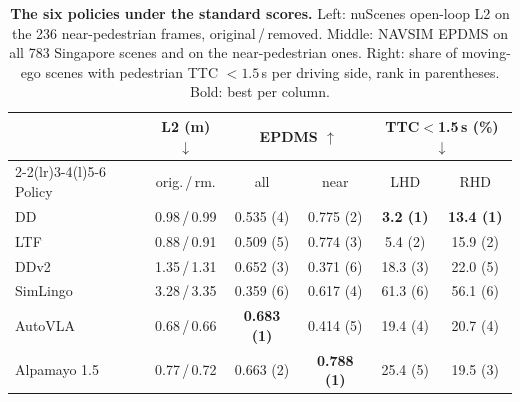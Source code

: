 \begin{table}[t]
\centering
\caption{\textbf{The six policies under the standard scores.} Left: nuScenes open-loop L2 on the 236 near-pedestrian frames, original\,/\,removed. Middle: NAVSIM EPDMS on all 783 Singapore scenes and on the \NumNclose{} near-pedestrian ones. Right: share of moving-ego scenes with pedestrian TTC $<1.5$\,s per driving side, rank in parentheses. Bold: best per column.}
\label{tab:bench}
\scriptsize
\setlength{\tabcolsep}{2.0pt}
\begin{tabular}{@{}lc cc cc@{}}
\toprule
 & L2 (m) $\downarrow$ & \multicolumn{2}{c}{EPDMS $\uparrow$} & \multicolumn{2}{c}{TTC$<$1.5\,s (\%) $\downarrow$} \\
\cmidrule(lr){2-2}\cmidrule(lr){3-4}\cmidrule(l){5-6}
Policy & orig.\,/\,rm. & all & near & LHD & RHD \\
\midrule
DD & 0.98\,/\,0.99 & 0.535 (4) & 0.775 (2) & \textbf{3.2 (1)} & \textbf{13.4 (1)} \\
LTF & 0.88\,/\,0.91 & 0.509 (5) & 0.774 (3) & 5.4 (2) & 15.9 (2) \\
DDv2 & 1.35\,/\,1.31 & 0.652 (3) & 0.371 (6) & 18.3 (3) & 22.0 (5) \\
SimLingo & 3.28\,/\,3.35 & 0.359 (6) & 0.617 (4) & 61.3 (6) & 56.1 (6) \\
AutoVLA & 0.68\,/\,0.66 & \textbf{0.683 (1)} & 0.414 (5) & 19.4 (4) & 20.7 (4) \\
Alpamayo 1.5 & 0.77\,/\,0.72 & 0.663 (2) & \textbf{0.788 (1)} & 25.4 (5) & 19.5 (3) \\
\bottomrule
\end{tabular}
\end{table}
